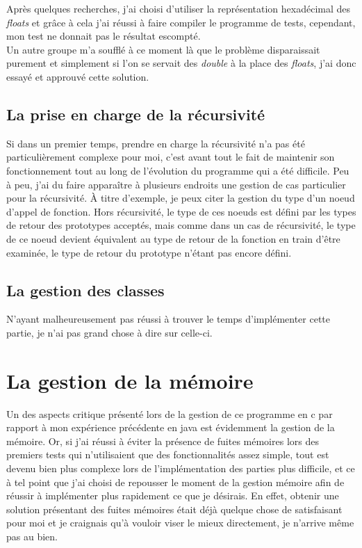 \documentclass[12pt]{article}
\begin{document}
Après quelques recherches, j'ai choisi d'utiliser la représentation
hexadécimal des {\em floats} et grâce à cela j'ai réussi à faire compiler le
programme de tests, cependant, mon test ne donnait pas le résultat escompté.
\\

Un autre groupe m'a soufflé à ce moment là que le problème disparaissait
purement et simplement si l'on se servait des {\em double} à la place des
{\em floats}, j'ai donc essayé et approuvé cette solution.

\subsection{La prise en charge de la récursivité}
Si dans un premier temps, prendre en charge la récursivité n'a pas été
particulièrement complexe pour moi, c'est avant tout le fait de maintenir son
fonctionnement tout au long de l'évolution du programme qui a été difficile.
Peu à peu, j'ai du faire apparaître à plusieurs endroits une gestion de cas
particulier pour la récursivité. À titre d'exemple, je peux citer la gestion
du type d'un noeud d'appel de fonction. Hors récursivité, le type de ces
noeuds est défini par les types de retour des prototypes acceptés, mais comme 
dans un cas de récursivité, le type de ce noeud devient équivalent au type de
retour de la fonction en train d'être examinée, le type de retour du prototype
n'étant pas encore défini.

\subsection{La gestion des classes}
N'ayant malheureusement pas réussi à trouver le temps d'implémenter cette
partie, je n'ai pas grand chose à dire sur celle-ci.

\section{La gestion de la mémoire}
Un des aspects critique présenté lors de la gestion de ce programme en c par
rapport à mon expérience précédente en java est évidemment la gestion de
la mémoire. Or, si j'ai réussi à éviter la présence de fuites mémoires lors
des premiers tests qui n'utilisaient que des fonctionnalités assez simple,
tout est devenu bien plus complexe lors de l'implémentation des parties plus
difficile, et ce à tel point que j'ai choisi de repousser le moment de la
gestion mémoire afin de réussir à implémenter plus rapidement ce que je
désirais. En effet, obtenir une solution présentant des fuites mémoires était
déjà quelque chose de satisfaisant pour moi et je craignais qu'à vouloir
viser le mieux directement, je n'arrive même pas au bien.
\end{document}
